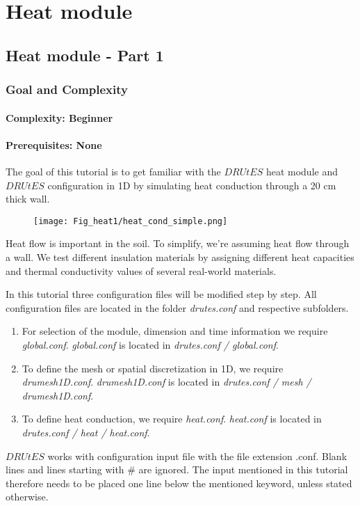 
\chapter{Heat module}

\section{Heat module - Part 1}


\subsection{Goal and Complexity}
\subsubsection*{Complexity: Beginner}

\subsubsection*{Prerequisites: None}

The goal of this tutorial is to get familiar with the $DRUtES$ heat module and  $DRUtES$ configuration in 1D by simulating heat conduction through a 20 cm thick wall.\medskip

\begin{figure}[!h]
\centering
\texttt{[image: Fig\_heat1/heat\_cond\_simple.png]}
\end{figure}
Heat flow is important in the soil. To simplify, we're assuming heat flow through a wall. We test different insulation materials by assigning different heat capacities and thermal conductivity values of several real-world materials. 

In this tutorial three configuration files will be modified step by step. All configuration files are located in the folder \emph{drutes.conf} and respective subfolders. \begin{enumerate}
\item For selection of the module, dimension and time information we require \emph{global.conf}.  \emph{global.conf} is located in \emph{drutes.conf / global.conf}. 
\item To define the mesh or spatial discretization in 1D,  we require \emph{drumesh1D.conf}. \emph{drumesh1D.conf} is located in \emph{drutes.conf / mesh / drumesh1D.conf}. 
\item To define heat conduction, we require \emph{heat.conf}. \emph{heat.conf} is located in \emph{drutes.conf / heat / heat.conf}. 
\end{enumerate}
$DRUtES$ works with configuration input file with the file extension .conf. Blank lines and lines starting with \# are ignored. The input mentioned in this tutorial therefore needs to be placed one line below the mentioned keyword, unless stated otherwise. 



